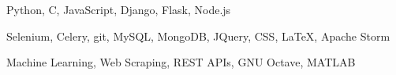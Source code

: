 

\begin{comment}

\begin{itemize}
  \item{\footnotesize Python, C, JavaScript, Django, Flask, Node.js}
  \item{\footnotesize Selenium, Celery, git, MySQL, MongoDB, JQuery, CSS, \LaTeX}
  \item{\footnotesize Machine Learning, Web Scraping, REST APIs, GNU Octave}
\end{itemize}

\end{comment}

\begin{cvhonors}

  \cvhonor
    {} %
    {Python, C, JavaScript, Django, Flask, Node.js} %
    {} %
    {\bullet} %

  \cvhonor
    {} %
    {Selenium, Celery, git, MySQL, MongoDB, JQuery, CSS, \LaTeX, Apache Storm} %
    {} %
    {\bullet} %

  \cvhonor
    {} %
    {Machine Learning, Web Scraping, REST APIs, GNU Octave, MATLAB} %
    {} %
    {\bullet} %

\end{cvhonors}
